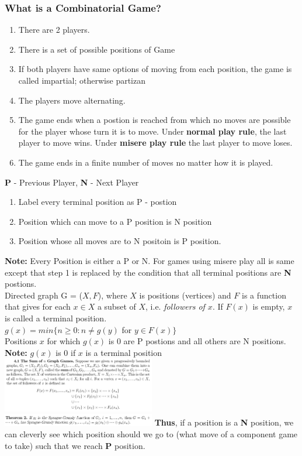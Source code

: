 \documentclass[8pt, a4paper, oneside, twocolumn]{extarticle}
\begin{document}
\subsubsection{What is a Combinatorial Game?}
\begin{enumerate}
\item There are 2 players.
\item There is a set of possible positions of Game
\item If both players have same options of moving from each position, the game is called impartial; otherwise partizan
\item The players move alternating.
\item The game ends when a postion is reached from which no moves are possible for the player whose turn it is to move. Under \textbf {normal play rule}, the last player to move wins. Under \textbf {misere play rule} the last player to move loses.
\item The game ends in a finite number of moves no matter how it is played.
\end{enumerate}
\textbf{P} - Previous Player, \textbf{N} - Next Player
\begin{enumerate}
\item Label every terminal position as P - postion
\item Position which can move to a P position is N position
\item Position whose all moves are to N positoin is P position.
\end{enumerate}
\textbf{Note: } Every Position is either a P or N. For games using misere play all is same except that step 1 is replaced by the condition that all terminal positions are \textbf{N} postions. \\
Directed graph G = ($X, F$), where $X$ is positions (vertices) and $F$ is a function that gives for each $x \in X$ a subset of $X$, i.e. \textit {followers of $x$}. If $F (x)$ is empty, $x$ is called a terminal position.\\
$g(x) = min \{ n \geq 0 : n \neq g (y)$ for $y \in F (x)\}$\\
Positions $x$ for which $g(x)$ is 0 are P postions and all others are N positions. \textbf{Note:} $g(x)$ is 0 if $x$ is a terminal position\\
\includegraphics[width=0.5\textwidth,height=0.5\textheight,keepaspectratio]{sumgraph}
\includegraphics[width=0.5\textwidth,height=0.5\textheight,keepaspectratio]{sgth}
\textbf{Thus}, if a position is a \textbf{N} position, we can cleverly see which position should we go to (what move of a component game to take) such that we reach \textbf {P} position.
\end{document}
